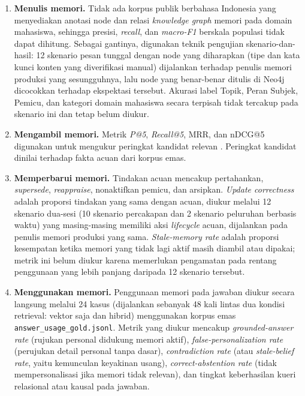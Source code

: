 \begin{enumerate}[label=\arabic*.,leftmargin=*,itemsep=3pt]
  \item \textbf{Menulis memori.} Tidak ada korpus publik berbahasa Indonesia yang menyediakan anotasi node dan relasi \textit{knowledge graph} memori pada domain mahasiswa, sehingga presisi, \textit{recall}, dan \textit{macro-F1} berskala populasi tidak dapat dihitung. Sebagai gantinya, digunakan teknik pengujian skenario-dan-hasil: 12 skenario pesan tunggal dengan node yang diharapkan (tipe dan kata kunci konten yang diverifikasi manual) dijalankan terhadap penulis memori produksi yang sesungguhnya, lalu node yang benar-benar ditulis di Neo4j dicocokkan terhadap ekspektasi tersebut. Akurasi label Topik, Peran Subjek, Pemicu, dan kategori domain mahasiswa secara terpisah tidak tercakup pada skenario ini dan tetap belum diukur.
  \item \textbf{Mengambil memori.} Metrik \textit{P@5}, \textit{Recall@5}, MRR, dan nDCG@5 digunakan untuk mengukur peringkat kandidat relevan \parencite{jarvelin2002cumulated}. Peringkat kandidat dinilai terhadap fakta acuan dari korpus emas.
  \item \textbf{Memperbarui memori.} Tindakan acuan mencakup pertahankan, \textit{supersede}, \textit{reappraise}, nonaktifkan pemicu, dan arsipkan. \textit{Update correctness} adalah proporsi tindakan yang sama dengan acuan, diukur melalui 12 skenario dua-sesi (10 skenario percakapan dan 2 skenario peluruhan berbasis waktu) yang masing-masing memiliki aksi \textit{lifecycle} acuan, dijalankan pada penulis memori produksi yang sama. \textit{Stale-memory rate} adalah proporsi kesempatan ketika memori yang tidak lagi aktif masih diambil atau dipakai; metrik ini belum diukur karena memerlukan pengamatan pada rentang penggunaan yang lebih panjang daripada 12 skenario tersebut.
  \item \textbf{Menggunakan memori.} Penggunaan memori pada jawaban diukur secara langsung melalui 24 kasus (dijalankan sebanyak 48 kali lintas dua kondisi retrieval: vektor saja dan hibrid) menggunakan korpus emas \texttt{answer\_usage\_gold.jsonl}. Metrik yang diukur mencakup \textit{grounded-answer rate} (rujukan personal didukung memori aktif), \textit{false-personalization rate} (perujukan detail personal tanpa dasar), \textit{contradiction rate} (atau \textit{stale-belief rate}, yaitu kemunculan keyakinan usang), \textit{correct-abstention rate} (tidak mempersonalisasi jika memori tidak relevan), dan tingkat keberhasilan kueri relasional atau kausal pada jawaban.
\end{enumerate}


